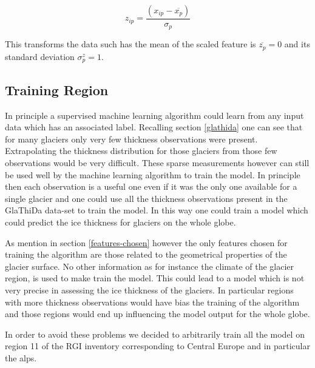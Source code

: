 \begin{equation}\label{eq:scale}
z_{ip} = \frac{(x_{ip} - \overline{x_p})}{\sigma_p}
\end{equation}

This transforms the data such has the mean of the scaled feature is $\overline{z_p}=0$ and its standard deviation $\sigma^z_p=1$.

\subsection{Training Region}\label{alps}
In principle a supervised machine learning algorithm could learn from any input data which has an associated label. Recalling section \ref{glathida} one can see that for many glaciers only very few thickness observations were present. Extrapolating the thickness distribution for those glaciers from those few observations would be very difficult. These sparse measurements however can still be used well by the machine learning algorithm to train the model. In principle then each observation is a useful one even if it was the only one available for a single glacier and one could use all the thickness observations present in the GlaThiDa data-set to train the model. In this way one could train a model which could predict the ice thickness for glaciers on the whole globe.

As mention in section \ref{features-chosen} however the only features chosen for training the algorithm are those related to the geometrical properties of the glacier surface. No other information as for instance the climate of the glacier region, is used to make train the model. This could lead to a model which is not very precise in assessing the ice thickness of the glaciers. In particular regions with more thickness observations would have bias the training of the algorithm and those regions would end up influencing the model output for the whole globe.

In order to avoid these problems we decided to arbitrarily train all the model on region 11 of the RGI inventory corresponding to Central Europe and in particular the alps. 

